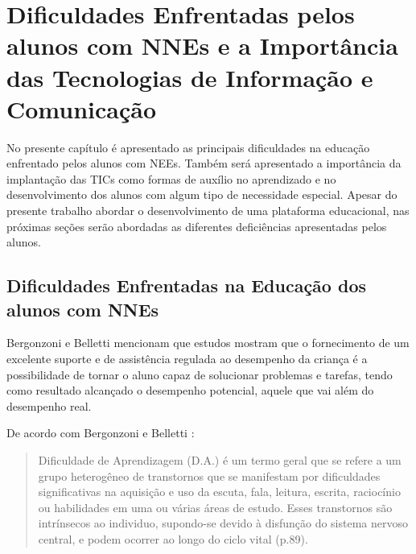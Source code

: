 \chapter{Dificuldades Enfrentadas pelos alunos com NNEs e a Importância das Tecnologias de Informação e Comunicação} \label{cap:funTeorica}

No presente capítulo é apresentado as principais dificuldades na educação enfrentado pelos alunos com NEEs. Também será apresentado a importância da implantação das TICs como formas de auxílio no aprendizado e no desenvolvimento dos alunos com algum tipo de necessidade especial. Apesar do presente trabalho abordar o desenvolvimento de uma plataforma educacional, nas próximas seções serão abordadas as diferentes deficiências apresentadas pelos alunos.

\section{Dificuldades Enfrentadas na Educação dos alunos com NNEs} 

Bergonzoni e Belletti \cite{bergonzoni2006dificuldades} mencionam que estudos mostram que o fornecimento de um excelente suporte e de assistência regulada ao desempenho da criança é a possibilidade de tornar o aluno capaz de solucionar problemas e tarefas, tendo como resultado alcançado o desempenho potencial, aquele que vai além do desempenho real.

De acordo com Bergonzoni e Belletti \cite{bergonzoni2006dificuldades}: 
\begin{quote} 
Dificuldade de Aprendizagem (D.A.) é um termo geral que se refere a um grupo heterogêneo de transtornos que se manifestam por dificuldades significativas na aquisição e uso da escuta, fala, leitura, escrita, raciocínio ou habilidades em uma ou várias áreas de estudo. Esses transtornos são intrínsecos ao individuo, supondo-se devido à disfunção do sistema nervoso central, e podem ocorrer ao longo do ciclo vital (p.89).
\end{quote}

